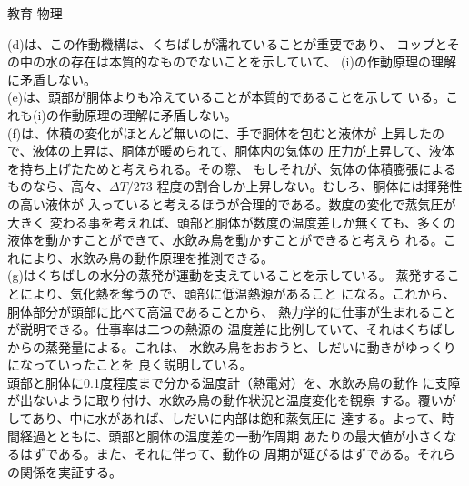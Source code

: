 \documentclass[fleqn]{jbook}
\begin{document}
\begin{answer}{教育 物理}{}
\begin{subanswers}
\begin{subsubanswers}
  \SubSubAnswer
    (d)は、この作動機構は、くちばしが濡れていることが重要であり、
    コップとその中の水の存在は本質的なものでないことを示していて、
    (i)の作動原理の理解に矛盾しない。\\
    (e)は、頭部が胴体よりも冷えていることが本質的であることを示して
    いる。これも(i)の作動原理の理解に矛盾しない。\\
    (f)は、体積の変化がほとんど無いのに、手で胴体を包むと液体が
    上昇したので、液体の上昇は、胴体が暖められて、胴体内の気体の
    圧力が上昇して、液体を持ち上げたためと考えられる。その際、
    もしそれが、気体の体積膨張によるものなら、高々、$\Delta T/273$
    程度の割合しか上昇しない。むしろ、胴体には揮発性の高い液体が
    入っていると考えるほうが合理的である。数度の変化で蒸気圧が大きく
    変わる事を考えれば、頭部と胴体が数度の温度差しか無くても、多くの
    液体を動かすことができて、水飲み鳥を動かすことができると考えら
    れる。これにより、水飲み鳥の動作原理を推測できる。\\
    (g)はくちばしの水分の蒸発が運動を支えていることを示している。
    蒸発することにより、気化熱を奪うので、頭部に低温熱源があること
    になる。これから、胴体部分が頭部に比べて高温であることから、
    熱力学的に仕事が生まれることが説明できる。仕事率は二つの熱源の
    温度差に比例していて、それはくちばしからの蒸発量による。これは、
    水飲み鳥をおおうと、しだいに動きがゆっくりになっていったことを
    良く説明している。\\


  \SubSubAnswer
    頭部と胴体に0.1度程度まで分かる温度計（熱電対）を、水飲み鳥の動作
    に支障が出ないように取り付け、水飲み鳥の動作状況と温度変化を観察
    する。覆いがしてあり、中に水があれば、しだいに内部は飽和蒸気圧に
    達する。よって、時間経過とともに、頭部と胴体の温度差の一動作周期
    あたりの最大値が小さくなるはずである。また、それに伴って、動作の
    周期が延びるはずである。それらの関係を実証する。

  \end{subsubanswers}
\end{subanswers}
\end{answer}
\end{document}
